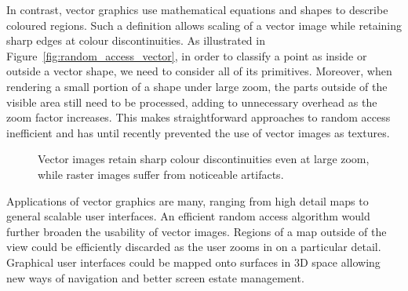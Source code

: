 \documentclass[11pt,a4paper,twoside]{article}
\begin{document}
In contrast, vector graphics use mathematical equations and shapes to describe coloured regions. Such a definition allows scaling of a vector image while retaining sharp edges at colour discontinuities. As illustrated in Figure~\ref{fig:random_access_vector}, in order to classify a point as inside or outside a vector shape, we need to consider all of its primitives. Moreover, when rendering a small portion of a shape under large zoom, the parts outside of the visible area still need to be processed, adding to unnecessary overhead as the zoom factor increases. This makes straightforward approaches to random access inefficient and has until recently prevented the use of vector images as textures.


\begin {figure}
	\centering
	\hspace{1.0cm}
	\caption {Vector images retain sharp colour discontinuities even at large zoom, while raster images suffer from noticeable artifacts.}
	\label {fig:zoom}
\end {figure}

Applications of vector graphics are many, ranging from high detail maps to general scalable user interfaces.  An efficient random access algorithm would further broaden the usability of vector images. Regions of a map outside of the view could be efficiently discarded as the user zooms in on a particular detail. Graphical user interfaces could be mapped onto surfaces in 3D space allowing new ways of navigation and better screen estate management.
\end{document}
